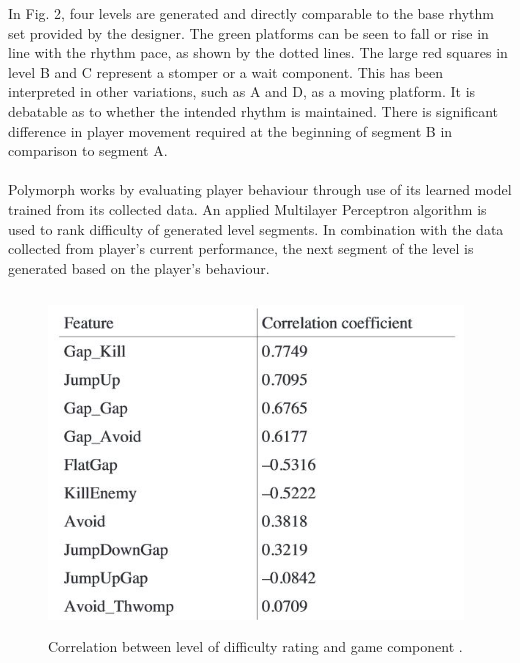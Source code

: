 \documentclass{scrartcl}
\begin{document}
In Fig. 2, four levels are generated and directly comparable to the base rhythm set provided by the designer. The green platforms can be seen to fall or rise in line with the rhythm pace, as shown by the dotted lines. The large red squares in level B and C represent a stomper or a wait component. This has been interpreted in other variations, such as A and D, as a moving platform. It is debatable as to whether the intended rhythm is maintained. There is significant difference in player movement required at the beginning of segment B in comparison to segment A. \\ \\
Polymorph works by evaluating player behaviour through use of its learned model trained from its collected data. An applied Multilayer Perceptron algorithm is used to rank difficulty of generated level segments. In combination with the data collected from player's current performance, the next segment of the level is generated based on the player's behaviour.

\begin{figure}[h]
\includegraphics[width=11cm, height=9cm]{Jen_Fig2}
\centering
\caption{Correlation between level of difficulty rating and game component \cite{Jennings2010:Model}.}
\end{figure}
\end{document}
